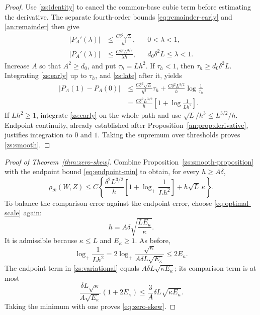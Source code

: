 \documentclass[11pt,letterpaper]{article}
\theoremstyle{remark}
\newcommand{\rh}{\rho_{\mathcal R}}
\begin{document}
\begin{proof}
Use \eqref{zs:identity} to cancel the common-base cubic term before
estimating the derivative. The separate fourth-order bounds
\eqref{eq:remainder-early} and \eqref{an:remainder} then give
\begin{align}
 |P_A'(\lambda)|
 &\le \frac{C\delta^2\sqrt L}{h^3},
 &&0<\lambda<1,\label{zs:early}\\
 |P_A'(\lambda)|
 &\le \frac{C\delta^2L^{3/2}}{\lambda h},
 &&d_0\delta^2L\le\lambda<1.\label{zs:late}
\end{align}
Increase \(A\) so that \(A^2\ge d_0\), and put \(\tau_h=Lh^2\).
If \(\tau_h<1\), then \(\tau_h\ge d_0\delta^2L\). Integrating
\eqref{zs:early} up to \(\tau_h\), and \eqref{zs:late} after it,
yields
\begin{align*}
 |P_A(1)-P_A(0)|
 &\le \frac{C\delta^2\sqrt L}{h^3}\tau_h
       +\frac{C\delta^2L^{3/2}}h\log\frac1{\tau_h}\\
 &=\frac{C\delta^2L^{3/2}}h
       \left[1+\log\frac1{Lh^2}\right].
\end{align*}
If \(Lh^2\ge1\), integrate \eqref{zs:early} on the whole path and
use \(\sqrt L/h^3\le L^{3/2}/h\). Endpoint continuity, already
established after Proposition~\ref{an:prop:derivative}, justifies
integration to \(0\) and \(1\). Taking the supremum over thresholds
proves \eqref{zs:smooth}.
\end{proof}

\begin{proof}[Proof of Theorem~\ref{thm:zero-skew}]
Combine Proposition~\ref{zs:smooth-proposition} with the endpoint
bound \eqref{eq:endpoint-min} to obtain, for every \(h\ge A\delta\),
\begin{equation}
 \rh(W,Z)\le C\left\{
 \frac{\delta^2L^{3/2}}h
 \left[1+\log_+\frac1{Lh^2}\right]+h\sqrt L\,\kappa\right\}.
 \label{zs:variational}
\end{equation}
To balance the comparison error against the endpoint error, choose
\eqref{eq:optimal-scale} again:
\[
 h=A\delta\sqrt{\frac{LE_\kappa}{\kappa}}.
\]
It is admissible because \(\kappa\le L\) and \(E_\kappa\ge1\).
As before,
\[
 \log_+\frac1{Lh^2}
 =2\log_+\frac{\sqrt\kappa}{A\delta L\sqrt{E_\kappa}}
 \le2E_\kappa.
\]
The endpoint term in \eqref{zs:variational} equals
\(A\delta L\sqrt{\kappa E_\kappa}\); its comparison term is at most
\[
 \frac{\delta L\sqrt\kappa}{A\sqrt{E_\kappa}}(1+2E_\kappa)
 \le\frac3A\delta L\sqrt{\kappa E_\kappa}.
\]
Taking the minimum with one proves \eqref{eq:zero-skew}.

\end{proof}
\end{document}
